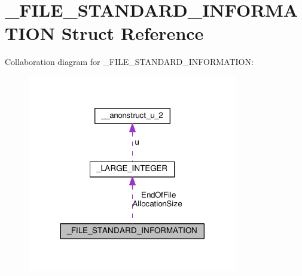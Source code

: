 \hypertarget{struct__FILE__STANDARD__INFORMATION}{}\section{\+\_\+\+F\+I\+L\+E\+\_\+\+S\+T\+A\+N\+D\+A\+R\+D\+\_\+\+I\+N\+F\+O\+R\+M\+A\+T\+I\+O\+N Struct Reference}
\label{struct__FILE__STANDARD__INFORMATION}


Collaboration diagram for \+\_\+\+F\+I\+L\+E\+\_\+\+S\+T\+A\+N\+D\+A\+R\+D\+\_\+\+I\+N\+F\+O\+R\+M\+A\+T\+I\+O\+N\+:
\nopagebreak
\begin{figure}[H]
\begin{center}
\leavevmode
\includegraphics[width=260pt]{struct__FILE__STANDARD__INFORMATION__coll__graph}
\end{center}
\end{figure}
